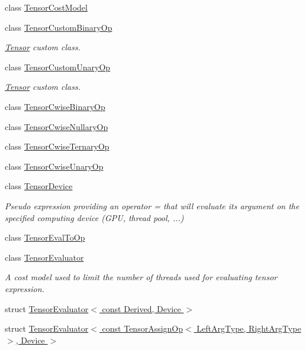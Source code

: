 \begin{DoxyCompactItemize}
class \hyperlink{class_eigen_1_1_tensor_cost_model}{Tensor\+Cost\+Model}
\item 
class \hyperlink{class_eigen_1_1_tensor_custom_binary_op}{Tensor\+Custom\+Binary\+Op}
\begin{DoxyCompactList}\small\item\em \hyperlink{class_eigen_1_1_tensor}{Tensor} custom class. \end{DoxyCompactList}\item 
class \hyperlink{class_eigen_1_1_tensor_custom_unary_op}{Tensor\+Custom\+Unary\+Op}
\begin{DoxyCompactList}\small\item\em \hyperlink{class_eigen_1_1_tensor}{Tensor} custom class. \end{DoxyCompactList}\item 
class \hyperlink{class_eigen_1_1_tensor_cwise_binary_op}{Tensor\+Cwise\+Binary\+Op}
\item 
class \hyperlink{class_eigen_1_1_tensor_cwise_nullary_op}{Tensor\+Cwise\+Nullary\+Op}
\item 
class \hyperlink{class_eigen_1_1_tensor_cwise_ternary_op}{Tensor\+Cwise\+Ternary\+Op}
\item 
class \hyperlink{class_eigen_1_1_tensor_cwise_unary_op}{Tensor\+Cwise\+Unary\+Op}
\item 
class \hyperlink{class_eigen_1_1_tensor_device}{Tensor\+Device}
\begin{DoxyCompactList}\small\item\em Pseudo expression providing an operator = that will evaluate its argument on the specified computing \textquotesingle{}device\textquotesingle{} (G\+PU, thread pool, ...) \end{DoxyCompactList}\item 
class \hyperlink{class_eigen_1_1_tensor_eval_to_op}{Tensor\+Eval\+To\+Op}
\item 
class \hyperlink{struct_eigen_1_1_tensor_evaluator}{Tensor\+Evaluator}
\begin{DoxyCompactList}\small\item\em A cost model used to limit the number of threads used for evaluating tensor expression. \end{DoxyCompactList}\item 
struct \hyperlink{struct_eigen_1_1_tensor_evaluator_3_01const_01_derived_00_01_device_01_4}{Tensor\+Evaluator$<$ const Derived, Device $>$}
\item 
struct \hyperlink{struct_eigen_1_1_tensor_evaluator_3_01const_01_tensor_assign_op_3_01_left_arg_type_00_01_right_arg_type_01_4_00_01_device_01_4}{Tensor\+Evaluator$<$ const Tensor\+Assign\+Op$<$ Left\+Arg\+Type, Right\+Arg\+Type $>$, Device $>$}

\end{DoxyCompactItemize}
